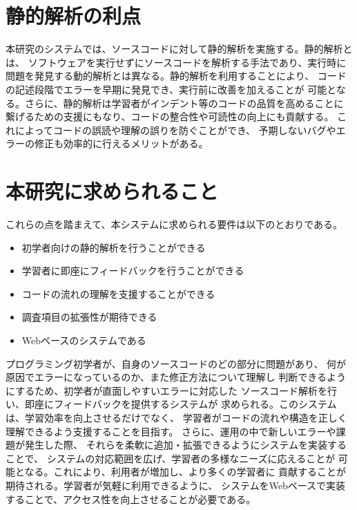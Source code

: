 \documentclass{cssspaper}
\begin{document}
        \section{静的解析の利点}
        本研究のシステムでは、ソースコードに対して静的解析を実施する。静的解析とは、
        ソフトウェアを実行せずにソースコードを解析する手法であり、実行時に
        問題を発見する動的解析とは異なる。静的解析を利用することにより、
        コードの記述段階でエラーを早期に発見でき、実行前に改善を加えることが
        可能となる。さらに、静的解析は学習者がインデント等のコードの品質を高めることに
        繋げるための支援にもなり、コードの整合性や可読性の向上にも貢献する。
        これによってコードの誤読や理解の誤りを防ぐことができ、
        予期しないバグやエラーの修正も効率的に行えるメリットがある。

        \section{本研究に求められること}
        これらの点を踏まえて、本システムに求められる要件は以下のとおりである。
        \begin{itemize}
            \item 初学者向けの静的解析を行うことができる
            \item 学習者に即座にフィードバックを行うことができる
            \item コードの流れの理解を支援することができる
            \item 調査項目の拡張性が期待できる
            \item Webベースのシステムである
        \end{itemize}
        プログラミング初学者が、自身のソースコードのどの部分に問題があり、
        何が原因でエラーになっているのか、また修正方法について理解し
        判断できるようにするため、初学者が直面しやすいエラーに対応した
        ソースコード解析を行い、即座にフィードバックを提供するシステムが
        求められる。このシステムは、学習効率を向上させるだけでなく、
        学習者がコードの流れや構造を正しく理解できるよう支援することを目指す。
        さらに、運用の中で新しいエラーや課題が発生した際、
        それらを柔軟に追加・拡張できるようにシステムを実装することで、
        システムの対応範囲を広げ、学習者の多様なニーズに応えることが
        可能となる。これにより、利用者が増加し、より多くの学習者に
        貢献することが期待される。学習者が気軽に利用できるように、
        システムをWebベースで実装することで、アクセス性を向上させることが必要である。
\end{document}

